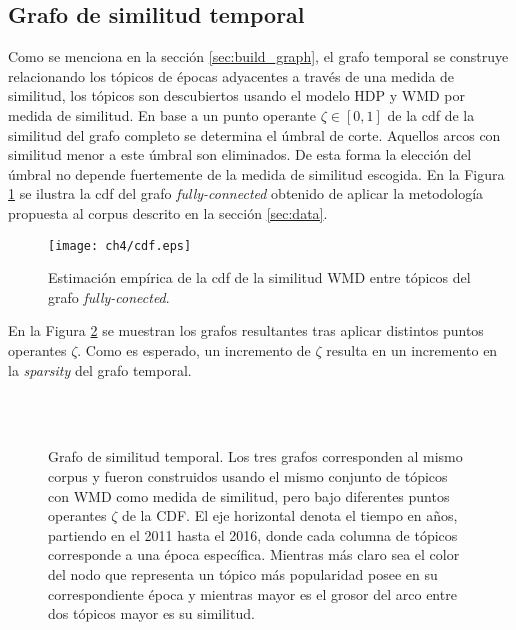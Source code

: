 \subsection{Grafo de similitud temporal}

Como se menciona en la sección \ref{sec:build_graph}, el grafo temporal se construye relacionando los tópicos de épocas adyacentes a través de una medida de similitud, los tópicos son descubiertos usando el modelo HDP y WMD por medida de similitud. En base a un punto operante $\zeta \in [0,1]$ de la cdf de la similitud del grafo completo se determina el úmbral de corte. Aquellos arcos con similitud menor a este úmbral son eliminados. De esta forma la elección del úmbral no depende fuertemente de la medida de similitud escogida. En la Figura \ref{img:cdf_wmd} se ilustra la cdf del grafo \textit{fully-connected} obtenido de aplicar la metodología propuesta al corpus descrito en la sección \ref{sec:data}.

\begin{figure}
    \centering
    \texttt{[image: ch4/cdf.eps]}
    \caption{Estimación empírica de la cdf de la similitud WMD entre tópicos del grafo \textit{fully-conected}.}
    \label{img:cdf_wmd}
\end{figure}

En la Figura \ref{img:temporal_similarity_graphs} se muestran los grafos resultantes tras aplicar distintos puntos operantes $\zeta$. Como es esperado, un incremento de $\zeta$ resulta en un incremento en la \textit{sparsity} del grafo temporal.

\begin{figure}
\centering
{}
\\
\\
\caption{Grafo de similitud temporal. Los tres grafos corresponden al mismo corpus y fueron construidos usando el mismo conjunto de tópicos con WMD como medida de similitud, pero bajo diferentes puntos operantes $\zeta$ de la CDF. El eje horizontal denota el tiempo en años, partiendo en el 2011 hasta el 2016, donde cada columna de tópicos corresponde a una época específica. Mientras más claro sea el color del nodo que representa un tópico más popularidad posee en su correspondiente época y mientras mayor es el grosor del arco entre dos tópicos mayor es su similitud.}
\label{img:temporal_similarity_graphs}
\end{figure}


